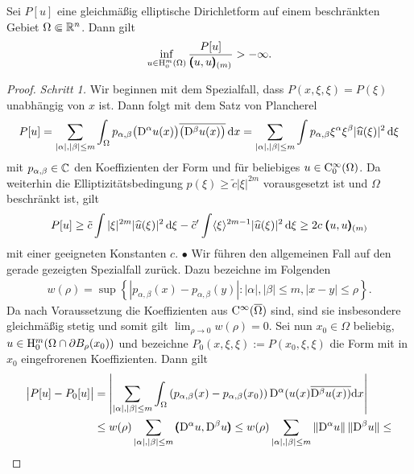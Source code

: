 \begin{thm}
Sei $P[u]$ eine gleichmäßig elliptische Dirichletform auf einem beschränkten Gebiet $\Omega\Subset\mathbb R^n$. Dann gilt
\begin{equation}
  \inf_{u\in\mathrm H_0^m(\Omega)} \frac{P[u]}{\pmb(u,u\pmb)_{(m)}} > -\infty.
\end{equation}
\end{thm}
\begin{proof}
{\sl Schritt 1.} Wir beginnen mit dem Spezialfall, dass $P(x,\xi,\xi) = P(\xi)$ unabhängig von $x$ ist. Dann folgt mit dem Satz von Plancherel
\begin{equation}
 P[u] =  \sum_{|\alpha|,|\beta|\le m} \int_\Omega  p_{\alpha,\beta} \big(\mathrm D^\alpha u(x)\big)\overline{\big(\mathrm D^\beta u(x)\big)} \,\mathrm d x
 =   \sum_{|\alpha|,|\beta|\le m} \int  p_{\alpha,\beta} \xi^\alpha \xi^\beta  |\widehat u(\xi)|^2 \,\mathrm d\xi 
\end{equation}
mit $p_{\alpha,\beta}\in\mathbb C$ den Koeffizienten der Form und für beliebiges $u\in\mathrm C_0^\infty(\Omega)$. Da weiterhin die Elliptizitätsbedingung $p(\xi)\ge \tilde c |\xi|^{2m}$ 
vorausgesetzt ist und $\Omega$ beschränkt ist, gilt
\begin{equation}
  P[u] \ge \tilde c \int |\xi|^{2m} |\widehat u(\xi)|^2 \,\mathrm d\xi  -  \tilde c' \int \langle \xi\rangle^{2m-1} |\widehat u(\xi)|^2 \,\mathrm d\xi  \ge  2c\; \pmb(u,u\pmb)_{(m)}
\end{equation}
mit einer geeigneten Konstanten $c$. $\bullet$  Wir führen den allgemeinen Fall auf den gerade gezeigten Spezialfall zurück. Dazu bezeichne im Folgenden
\begin{align}
	w(\rho) = \sup\left\{| p_{\alpha,\beta}(x)-p_{\alpha,\beta}(y)| : |\alpha|, |\beta| \le m, | x-y| \le \rho\right\}.
\end{align} 
Da nach Voraussetzung die Koeffizienten aus $\mathrm C^\infty(\overline\Omega)$ sind, sind sie insbesondere gleichmäßig stetig und somit gilt
$\lim_{\rho\to0} w(\rho)=0$.  Sei nun $x_0\in \Omega$ beliebig, $u\in \mathrm H_0^m(\Omega\cap \partial B_\rho(x_0))$ und bezeichne $P_0(x,\xi, \xi):=P(x_0,\xi,\xi)$ die Form mit in $x_0$ eingefrorenen Koeffizienten. Dann gilt
\begin{align}
\begin{split}
\big| P[u]-P_0[u] \big| &=\left| \sum\limits_{|\alpha|, |\beta| \le m} \int_\Omega \left(p_{\alpha,\beta}(x)-p_{\alpha,\beta}(x_0)\right){\D^\alpha(u(x)}\overline{\D^\beta u(x))}\mathrm{d}x\right|\\
	&\le w(\rho) \sum\limits_{|\alpha|,|\beta| \le m} \spro{\D^\alpha u}{\D^\beta u} \le  w(\rho) \sum\limits_{|\alpha|,|\beta| \le m}\|\D^\alpha u\|\, \|\D^\beta u\| \le

\end{split}
\end{align}
\end{proof}
